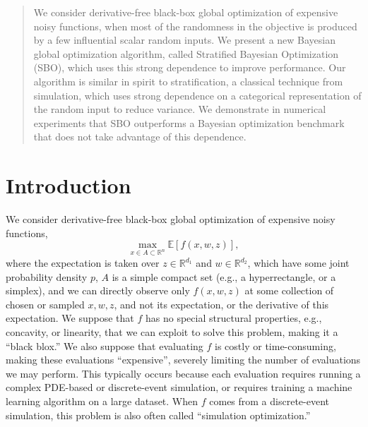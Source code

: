 \documentclass{article}
\newcommand{\w}{w}
\newcommand{\z}{z}
\begin{document}
 


\begin{abstract} 
We consider derivative-free black-box global optimization of expensive noisy functions,
when most of the randomness in the objective is produced
by a few influential scalar random inputs. We present a new Bayesian global
optimization algorithm, called Stratified Bayesian Optimization (SBO), which uses
this strong dependence to improve performance. Our algorithm is similar in spirit
to stratification, a classical technique from simulation, which uses strong
dependence on a categorical representation of the random input to reduce
variance. We demonstrate in numerical experiments that SBO outperforms a
Bayesian optimization benchmark that does not take advantage of this dependence.
\end{abstract} 


\section{Introduction} 
We consider derivative-free black-box global optimization of expensive noisy functions,
\begin{equation}
\max_{x\in A\subset\mathbb{R}^{n}}\mathbb{E}\left[f\left(x,\w,\z \right)\right],
\label{eq:goal}
\end{equation}
where the expectation is taken over $\z\in\mathbb{R}^{d_1}$ and $\w\in\mathbb{R}^{d_2}$, which have some joint probability density $p$, $A$ is a simple compact set (e.g., a hyperrectangle, or a simplex), and we can directly observe only $f(x,\w,\z)$ at some collection of chosen or sampled $x,\w,\z$, and not its expectation, or the derivative of this expectation.
We suppose that $f$ has no special structural properties, e.g., concavity, or linearity, that we can exploit to solve this problem, making it a ``black blox.''
We also suppose that evaluating $f$ is costly or time-consuming, making these evaluations ``expensive'', severely limiting the number of evaluations we may perform.  This typically occurs because each evaluation requires running a complex PDE-based or discrete-event simulation, or requires training a machine learning algorithm on a large dataset.
When $f$ comes from a discrete-event simulation, this problem is also often called ``simulation optimization.''
\end{document}
